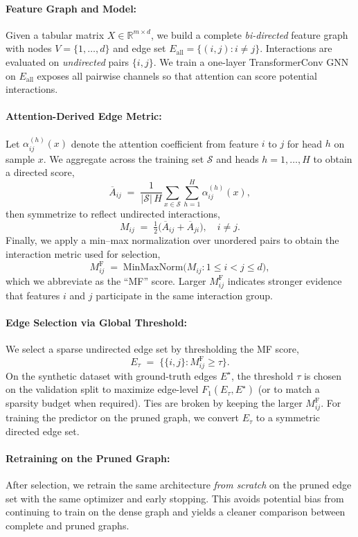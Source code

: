 \documentclass[10pt,a4paper]{article}
\begin{document}
\paragraph{Feature Graph and Model:}
Given a tabular matrix $X\in\mathbb{R}^{m\times d}$, we build a complete \emph{bi-directed} feature graph with nodes $V=\{1,\dots,d\}$ and edge set $E_{\mathrm{all}}=\{(i,j): i\neq j\}$. Interactions are evaluated on \emph{undirected} pairs $\{i,j\}$. We train a one-layer TransformerConv GNN on $E_{\mathrm{all}}$ exposes all pairwise channels so that attention can score potential interactions.

\paragraph{Attention-Derived Edge Metric:}
Let $\alpha^{(h)}_{ij}(x)$ denote the attention coefficient from feature $i$ to $j$ for head $h$ on sample $x$. We aggregate across the training set $\mathcal{S}$ and heads $h=1,\dots,H$ to obtain a directed score,
\[
\overline{A}_{ij} \;=\; \frac{1}{|\mathcal{S}|\,H} \sum_{x\in\mathcal{S}} \sum_{h=1}^H \alpha^{(h)}_{ij}(x),
\]
then symmetrize to reflect undirected interactions,
\[
M_{ij} \;=\; \tfrac{1}{2}\big(\overline{A}_{ij} + \overline{A}_{ji}\big), \quad i\neq j.
\]
Finally, we apply a min--max normalization over unordered pairs to obtain the interaction metric used for selection,
\[
M^{\mathrm{F}}_{ij} \;=\; \mathrm{MinMaxNorm}\!\big( M_{ij} : 1 \le i < j \le d \big),
\]
which we abbreviate as the “MF” score. Larger $M^{\mathrm{F}}_{ij}$ indicates stronger evidence that features $i$ and $j$ participate in the same interaction group.

\paragraph{Edge Selection via Global Threshold:}
We select a sparse undirected edge set by thresholding the MF score,
\[
E_\tau \;=\; \big\{ \{i,j\} : M^{\mathrm{F}}_{ij} \ge \tau \big\}.
\]
On the synthetic dataset with ground-truth edges $E^\star$, the threshold $\tau$ is chosen on the validation split to maximize edge-level $F_1(E_\tau, E^\star)$ (or to match a sparsity budget when required). Ties are broken by keeping the larger $M^{\mathrm{F}}_{ij}$. For training the predictor on the pruned graph, we convert $E_\tau$ to a symmetric directed edge set.

\paragraph{Retraining on the Pruned Graph:}
After selection, we retrain the same architecture \emph{from scratch} on the pruned edge set with the same optimizer and early stopping. This avoids potential bias from continuing to train on the dense graph and yields a cleaner comparison between complete and pruned graphs.
\end{document}
